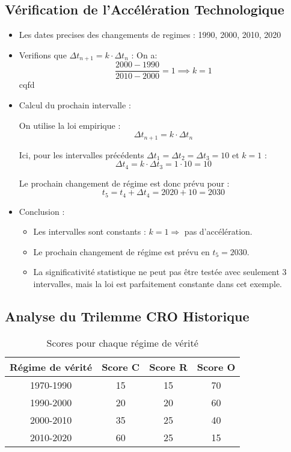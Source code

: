 \documentclass[11pt,a4paper]{article}
\begin{document}
\subsection{Vérification de l’Accélération Technologique}
\begin{itemize}
    \item Les dates precises des changements de regimes : 1990, 2000, 2010, 2020

    \item Verifions que $\Delta t_{n+1} = k \cdot \Delta t_n$ : 
On a: 
    \[
\frac{2000 - 1990}{2010 - 2000} = 1 \implies k = 1
\]
cqfd

\item Calcul du prochain intervalle : 

On utilise la loi empirique :
\[
\Delta t_{n+1} = k \cdot \Delta t_n
\]

Ici, pour les intervalles précédents \(\Delta t_1 = \Delta t_2 = \Delta t_3 = 10\) et \(k = 1\) :
\[
\Delta t_4 = k \cdot \Delta t_3 = 1 \cdot 10 = 10
\]

Le prochain changement de régime est donc prévu pour :
\[
t_5 = t_4 + \Delta t_4 = 2020 + 10 = 2030
\]

\item Conclusion : 
\begin{itemize}
    \item Les intervalles sont constants : \( k = 1 \Rightarrow \) pas d'accélération.
    \item Le prochain changement de régime est prévu en \( t_5 = 2030 \).
    \item La significativité statistique ne peut pas être testée avec seulement 3 intervalles, mais la loi est parfaitement constante dans cet exemple.
\end{itemize}
\end{itemize}

\subsection{Analyse du Trilemme CRO Historique}

\begin{table}[htbp]
\centering
\caption{Scores pour chaque régime de vérité}
\begin{tabular}{|c|c|c|c|}
\hline
\textbf{Régime de vérité} & \textbf{Score C} & \textbf{Score R } & \textbf{Score O} \\
\hline
1970-1990 & 15 & 15 & 70 \\
\hline
1990-2000 & 20 & 20 & 60 \\
\hline
2000-2010 & 35 & 25 & 40 \\
\hline
2010-2020 & 60 & 25 & 15 \\
\hline
\end{tabular}
\end{table}
\end{document}
